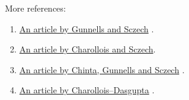 \documentclass[11pt,a4paper,notitlepage]{article}
\begin{document}
More references:
\begin{enumerate}
\item \href{gunnells_sczech.pdf}{An article by Gunnells and Sczech} \cite{MR1980994}.
\item \href{Charollois-Sczech_EMS.pdf}{An article by Charollois and Sczech}\cite{MR3526308}. 
\item \href{0001011.pdf}{An article by Chinta, Gunnells and Sczech} \cite{MR1850609}.
\item \href{1206.3050.pdf}{An article by Charollois--Dasgupta} \cite{MR3272012}.
\end{enumerate}

	
	
\end{document}
